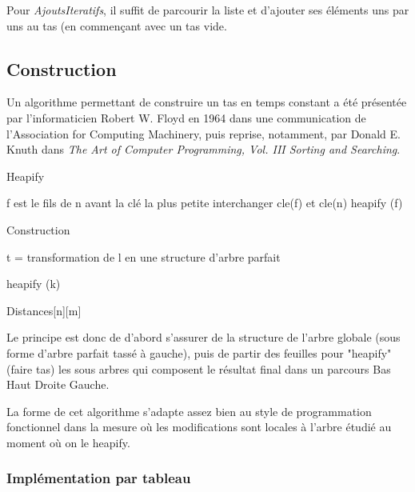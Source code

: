 \documentclass[12pt,a4paper]{article}
\begin{document}
Pour \textit{AjoutsIteratifs}, il suffit de parcourir la liste et d'ajouter ses éléments uns par uns au tas (en commençant avec un tas vide.

\subsection{Construction}

Un algorithme permettant de construire un tas en temps constant a été présentée par l'informaticien Robert W. Floyd en 1964 dans une communication de l'Association for Computing Machinery\cite{ACM}, puis reprise, notamment, par Donald E. Knuth dans \textit{The Art of Computer Programming, Vol. III Sorting and Searching}\cite{Knuth}.


\begin{algorithm}
\caption{Heapify}
\begin{algorithmic}
 	\STATE f est le fils de n avant la clé la plus petite
 	\STATE interchanger cle(f) et cle(n)
 	\STATE heapify (f)
\ENDIF
\end{algorithmic}
\end{algorithm}

\begin{algorithm}
\caption{Construction}
\begin{algorithmic}
\STATE t = transformation de l en une structure d'arbre parfait


\STATE heapify (k)
	
\ENDFOR
\RETURN Distances[n][m]
\end{algorithmic}
\end{algorithm}

Le principe est donc de d'abord s'assurer de la structure de l'arbre globale (sous forme d'arbre parfait tassé à gauche), puis de partir des feuilles pour "heapify" (faire tas) les sous arbres qui composent le résultat final dans un parcours Bas Haut Droite Gauche.

La forme de cet algorithme s'adapte assez bien au style de programmation fonctionnel dans la mesure où les modifications sont locales à l'arbre étudié au moment où on le heapify.


\subsubsection{Implémentation par tableau}
\end{document}
